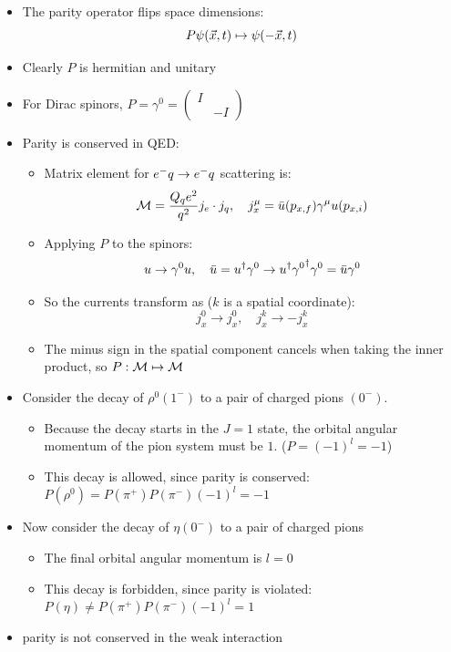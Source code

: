 \begin{itemize}
  \item The parity operator flips space dimensions:
  \begin{equation}
    P \psi(\vec{x},t)\mapsto \psi(-\vec{x},t)
  \end{equation}
  \item Clearly $P$ is hermitian and unitary
  \item For Dirac spinors, $P = \gamma^0 = \begin{pmatrix} I & \\ & -I \end{pmatrix}$
  \item Parity is conserved in QED:
  \begin{itemize}
    \item Matrix element for $e^{-} q \rightarrow e^{-} q$ scattering is:
    \begin{equation}
      \mathcal{M} = \frac{Q_qe^2}{q^2}j_e \cdot j_q, \quad j_x^\mu = \bar{u}(p_{x,f})\gamma^\mu u(p_{x,i})
    \end{equation}
    \item Applying $P$ to the spinors:
    \begin{equation}
      u \rightarrow \gamma^0 u, \quad \bar{u} = u^\dag\gamma^0 \rightarrow u^\dag {\gamma^0}^\dag \gamma^0 = \bar{u} \gamma^0
    \end{equation}
    \item So the currents transform as ($k$ is a spatial coordinate):
    \begin{equation}
      j_x^0 \rightarrow j_x^0, \quad j_x^k \rightarrow -j_x^k
    \end{equation}
    \item The minus sign in the spatial component cancels when taking the inner product, so $P:\mathcal{M} \mapsto \mathcal{M}$
  \end{itemize}
  \item Consider the decay of $\rho^0(1^-)$ to a pair of charged pions $(0^-)$. 
  \begin{itemize}
    \item Because the decay starts in the $J=1$ state, the orbital angular momentum of the pion system must be $1$. ($P = (-1)^l = -1$)
    \item This decay is allowed, since parity is conserved: $P(\rho^0) = P(\pi^+)P(\pi^-)(-1)^l = -1$
  \end{itemize}
  \item Now consider the decay of $\eta(0^-)$ to a pair of charged pions
  \begin{itemize}
    \item The final orbital angular momentum is $l=0$
    \item This decay is forbidden, since parity is violated: $P(\eta) \neq P(\pi^+)P(\pi^-)(-1)^l = 1$
  \end{itemize}
  \item \thus parity is not conserved in the weak interaction
\end{itemize}

